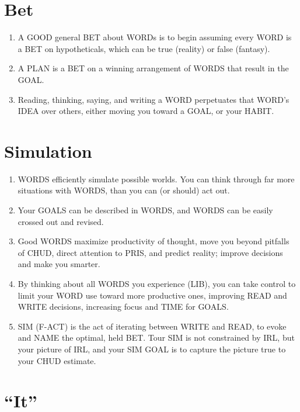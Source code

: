 \documentclass[
]{book}
\begin{document}
\hypertarget{bet-2}{%
\section{Bet}\label{bet-2}}

\begin{enumerate}
\def\labelenumi{\arabic{enumi}.}
\setcounter{enumi}{10}
\item
  A GOOD general BET about WORDs is to begin assuming every WORD is a
  BET on hypotheticals, which can be true (reality) or false
  (fantasy).
\item
  A PLAN is a BET on a winning arrangement of WORDS that result in the
  GOAL.
\item
  Reading, thinking, saying, and writing a WORD perpetuates that
  WORD's IDEA over others, either moving you toward a GOAL, or your
  HABIT.
\end{enumerate}

\hypertarget{simulation}{%
\section{Simulation}\label{simulation}}

\begin{enumerate}
\def\labelenumi{\arabic{enumi}.}
\setcounter{enumi}{13}
\item
  WORDS efficiently simulate possible worlds. You can think through
  far more situations with WORDS, than you can (or should) act out.
\item
  Your GOALS can be described in WORDS, and WORDS can be easily
  crossed out and revised.
\item
  Good WORDS maximize productivity of thought, move you beyond
  pitfalls of CHUD, direct attention to PRIS, and predict reality;
  improve decisions and make you smarter.
\item
  By thinking about all WORDS you experience (LIB), you can take
  control to limit your WORD use toward more productive ones,
  improving READ and WRITE decisions, increasing focus and TIME for
  GOALS.
\item
  SIM (F-ACT) is the act of iterating between WRITE and READ, to evoke
  and NAME the optimal, held BET. Tour SIM is not constrained by IRL,
  but your picture of IRL, and your SIM GOAL is to capture the picture
  true to your CHUD estimate.
\end{enumerate}

\hypertarget{it}{%
\section{``It''}\label{it}}
\end{document}
